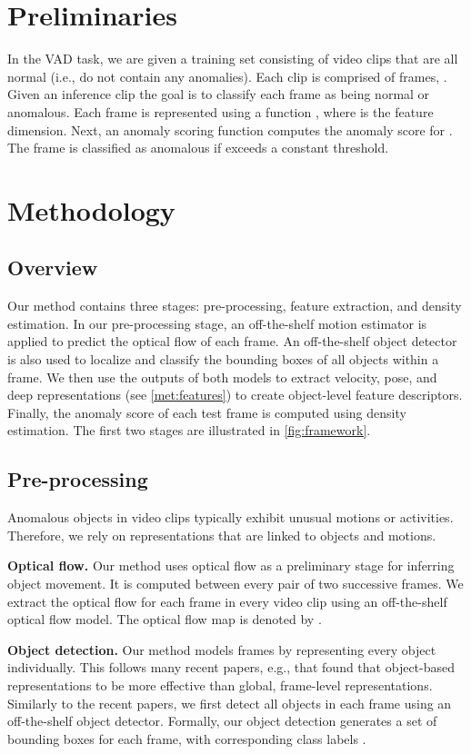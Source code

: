 \documentclass[10pt,twocolumn,letterpaper]{article}
\begin{document}
\section{Preliminaries}
In the VAD task, we are given a training set  consisting of  video clips that are all normal (i.e., do not contain any anomalies). Each clip  is comprised of  frames, . Given an inference clip  the goal is to classify each frame  as being normal or anomalous. Each frame  is represented using a function , where  is the feature dimension. Next, an anomaly scoring function  computes the anomaly score for . The frame is classified as anomalous if  exceeds a constant threshold.

\section{Methodology}
\label{sec:method}
\subsection{Overview}
Our method contains three stages: pre-processing, feature extraction, and density estimation. In our pre-processing stage, an off-the-shelf motion estimator is applied to predict the optical flow of each frame. An off-the-shelf object detector is also used to localize and classify the bounding boxes of all objects within a frame. We then use the outputs of both models to extract velocity, pose, and deep representations (see \cref{met:features}) to create object-level feature descriptors. Finally, the anomaly score of each test frame is computed using density estimation. The first two stages are illustrated in \cref{fig:framework}.

\subsection{Pre-processing}
Anomalous objects in video clips typically exhibit unusual motions or activities. Therefore, we rely on representations that are linked to objects and motions.

\textbf{Optical flow.} Our method uses optical flow as a preliminary stage for inferring object movement. It is computed between every pair of two successive frames. We extract the optical flow for each frame  in every video clip  using an off-the-shelf optical flow model. The optical flow map is denoted by .

\textbf{Object detection.} Our method models frames by representing every object individually. This follows many recent papers, e.g., \cite{Georgescu2021AnomalyDI,vad_iccv_2021,jigsaw_puzzles_eccv2022} that found that object-based representations to be more effective than global, frame-level representations. Similarly to the recent papers, we first detect all objects in each frame using an off-the-shelf object detector. Formally, our object detection generates a set of  bounding boxes  for each frame, with corresponding class labels .
\end{document}
